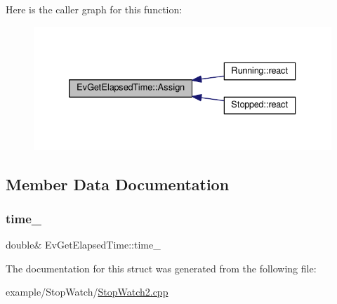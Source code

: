 Here is the caller graph for this function\+:
\nopagebreak
\begin{figure}[H]
\begin{center}
\leavevmode
\includegraphics[width=333pt]{struct_ev_get_elapsed_time_aa0381285a0151abbc5e8a57d088cc394_icgraph}
\end{center}
\end{figure}


\subsection{Member Data Documentation}
\mbox{\label{struct_ev_get_elapsed_time_ad4833ace67fda7df70233c80ca3a24a7}} 
\subsubsection{\texorpdfstring{time\+\_\+}{time\_}}
{\footnotesize\ttfamily double\& Ev\+Get\+Elapsed\+Time\+::time\+\_\+\hspace{0.3cm}{\ttfamily [private]}}



The documentation for this struct was generated from the following file\+:\begin{DoxyCompactItemize}
\item 
example/\+Stop\+Watch/\mbox{\hyperlink{_stop_watch2_8cpp}{Stop\+Watch2.\+cpp}}\end{DoxyCompactItemize}
